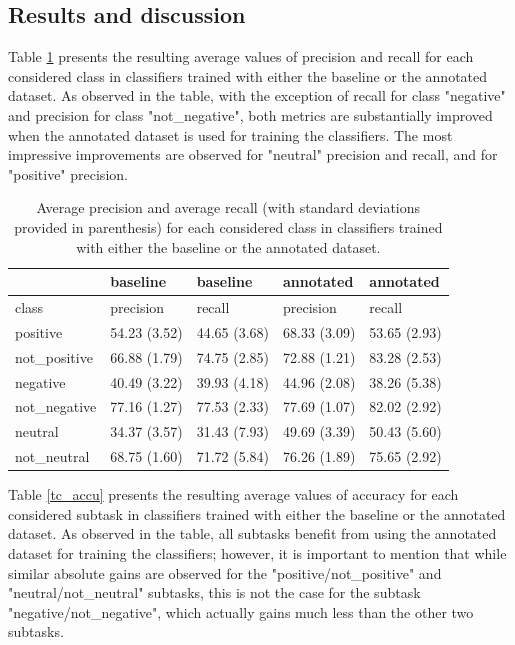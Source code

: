 \documentclass[11pt,letterpaper]{article}
\begin{document}
\subsection{Results and discussion}
Table \ref{tc_pre_rec} presents the resulting average values of precision and recall for each considered class 
in classifiers trained with either the baseline or the annotated dataset. As observed in the table, with the
exception of recall for class "negative" and precision for class "not\_negative", both metrics are substantially 
improved when the annotated dataset is used for training the classifiers. The most impressive improvements
are observed for "neutral" precision and recall, and for "positive" precision. 

\begin{table}
\begin{tabular}{|l|l|l|l|l|}
\hline
&baseline &baseline &annotated &annotated \\ 
\hline
class &precision &recall &precision &recall \\ 
\hline
positive &54.23 (3.52) &44.65 (3.68) &68.33 (3.09) &53.65 (2.93) \\ 
\hline
not\_positive &66.88 (1.79) &74.75 (2.85) &72.88 (1.21) &83.28 (2.53) \\ 
\hline
negative &40.49 (3.22) &39.93 (4.18) &44.96 (2.08) &38.26 (5.38) \\ 
\hline
not\_negative &77.16 (1.27) &77.53 (2.33) &77.69 (1.07) &82.02 (2.92) \\ 
\hline
neutral &34.37 (3.57) &31.43 (7.93) &49.69 (3.39) &50.43 (5.60) \\ 
\hline
not\_neutral &68.75 (1.60) &71.72 (5.84) &76.26 (1.89) &75.65 (2.92) \\ 
\hline
\end{tabular}
\caption{Average precision and average recall (with standard deviations provided in parenthesis) 
for each considered class in classifiers trained with either the baseline or the annotated dataset.}
\label{tc_pre_rec}
\end{table}

Table \ref{tc_accu} presents the resulting average values of accuracy for each considered subtask 
in classifiers trained with either the baseline or the annotated dataset. As observed in the table,
all subtasks benefit from using the annotated dataset for training the classifiers; however, it is 
important to mention that while similar absolute gains are observed for the "positive/not\_positive" and "neutral/not\_neutral"
subtasks, this is not the case for the subtask "negative/not\_negative", which actually gains much less than the other
two subtasks.
\end{document}
